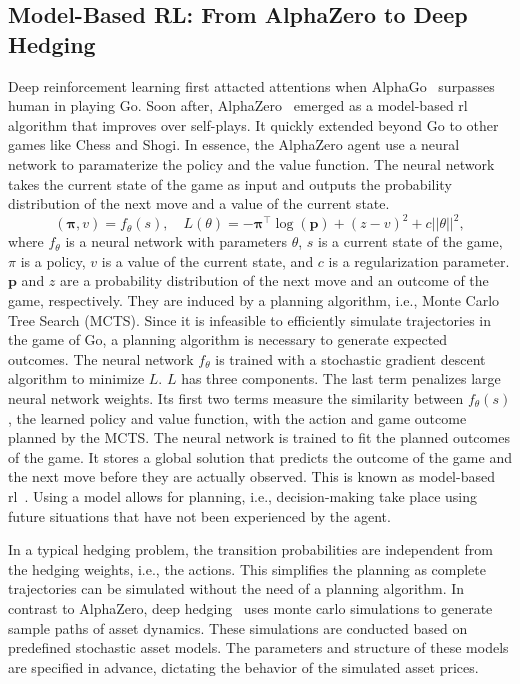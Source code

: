 \subsection{Model-Based RL: From AlphaZero to Deep Hedging}
Deep reinforcement learning first attacted attentions when AlphaGo~\citep{silver2016mastering} surpasses human in playing Go. 
Soon after, AlphaZero~\citep{silver2016mastering} emerged as a model-based \gls{rl} algorithm that improves over self-plays.
It quickly extended beyond Go to other games like Chess and Shogi.
In essence, the AlphaZero agent use a neural network to paramaterize the policy and the value function.
The neural network takes the current state of the game as input and outputs the probability distribution of the next move and a value of the current state.
\begin{equation}
    (\mathbf{\pi}, v) = f_{\theta}(s), \quad L(\theta) = - \mathbf{\pi}^{\intercal} \log(\mathbf{p}) + (z - v)^2  + c||\theta||^2,
\end{equation}
where $f_{\theta}$ is a neural network with parameters $\theta$, $s$ is a current state of the game, $\pi$ is a policy, $v$ is a value of the current state, and $c$ is a regularization parameter.
$\mathbf{p}$ and $z$ are a probability distribution of the next move and an outcome of the game, respectively.
They are induced by a planning algorithm, i.e., Monte Carlo Tree Search (MCTS).
Since it is infeasible to efficiently simulate trajectories in the game of Go, a planning algorithm is necessary to generate expected outcomes.
The neural network $f_{\theta}$ is trained with a stochastic gradient descent algorithm to minimize $L$.
$L$ has three components.
The last term penalizes large neural network weights.
Its first two terms measure the similarity between $f_{\theta}(s)$, the learned policy and value function, with the action and game outcome planned by the MCTS.
The neural network is trained to fit the planned outcomes of the game.
It stores a global solution that predicts the outcome of the game and the next move before they are actually observed.
This is known as model-based \gls{rl}~\citep{sutton2018reinforcement}.
Using a model allows for planning, i.e., decision-making take place using future situations that have not been experienced by the agent.

In a typical hedging problem, the transition probabilities are independent from the hedging weights, i.e., the actions.
This simplifies the planning as complete trajectories can be simulated without the need of a planning algorithm.
In contrast to AlphaZero, deep hedging~\citep{buehler2019deep} uses monte carlo simulations to generate sample paths of asset dynamics.
These simulations are conducted based on predefined stochastic asset models. 
The parameters and structure of these models are specified in advance, dictating the behavior of the simulated asset prices.

